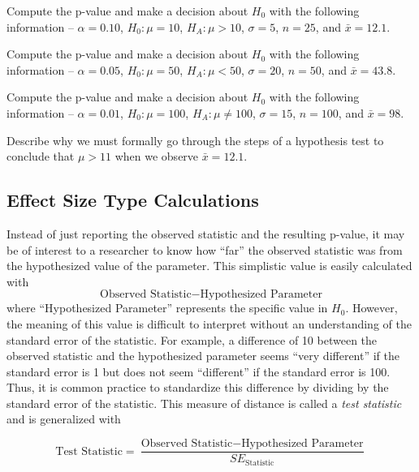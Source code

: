 \documentclass[10pt,openany]{book}\usepackage[]{graphicx}\usepackage[]{color}
\begin{document}
\begin{exsection}
  \item \label{revex:HypTCalc1} Compute the p-value and make a decision about $H_{0}$ with the following information -- $\alpha=0.10$, $H_{0}:\mu=10$, $H_{A}:\mu>10$, $\sigma=5$, $n=25$, and $\bar{x}=12.1$. 
  \item \label{revex:HypTCalc2} Compute the p-value and make a decision about $H_{0}$ with the following information -- $\alpha=0.05$, $H_{0}:\mu=50$, $H_{A}:\mu<50$, $\sigma=20$, $n=50$, and $\bar{x}=43.8$. 
  \item \label{revex:HypTCalc3}  Compute the p-value and make a decision about $H_{0}$ with the following information -- $\alpha=0.01$, $H_{0}:\mu=100$, $H_{A}:\mu\neq100$, $\sigma=15$, $n=100$, and $\bar{x}=98$. 
  \item \label{revex:HypTWhy} Describe why we must formally go through the steps of a hypothesis test to conclude that $\mu>11$ when we observe $\bar{x}=12.1$. 
\end{exsection}

\subsection{Effect Size Type Calculations}
Instead of just reporting the observed statistic and the resulting p-value, it may be of interest to a researcher to know how ``far'' the observed statistic was from the hypothesized value of the parameter.  This simplistic value is easily calculated with
\[ \text{Observed Statistic}-\text{Hypothesized Parameter} \]
where ``Hypothesized Parameter'' represents the specific value in $H_{0}$.  However, the meaning of this value is difficult to interpret without an understanding of the standard error of the statistic.  For example, a difference of 10 between the observed statistic and the hypothesized parameter seems ``very different'' if the standard error is 1 but does not seem ``different'' if the standard error is 100.  Thus, it is common practice to standardize this difference by dividing by the standard error of the statistic.  This measure of distance is called a \emph{test statistic} and is generalized with

\begin{equation}  \label{eqn:zTestStatGeneral}
  \text{Test Statistic} = \frac{\text{Observed Statistic}-\text{Hypothesized Parameter}}{SE_{\text{Statistic}}}
\end{equation}
\end{document}
